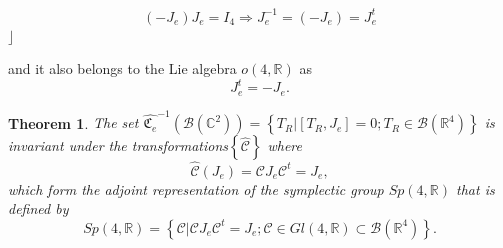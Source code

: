 \documentclass[aps,preprint]{revtex4}%
\newtheorem{theorem}{Theorem}
\begin{document}
\begin{equation}
\left(  -J_{e}\right)  J_{e}=I_{4}\Rightarrow J_{e}^{-1}=\left(
-J_{e}\right)  =J_{e}^{t}%
\end{equation}
$\rfloor$

and it also belongs to the Lie algebra $o\left(  4,\mathbb{R}\right)  $ as
\begin{equation}
J_{e}^{t}=-J_{e}.
\end{equation}


\begin{theorem}
The set $\widehat{\mathfrak{C}_{e}}^{-1}\left(  \mathcal{B}\left(
\mathbb{C}^{2}\right)  \right)  =\left\{  \left.  T_{R}\right\vert \left[
T_{R},J_{e}\right]  =0;T_{R}\in\mathcal{B}\left(  \mathbb{R}^{4}\right)
\right\}  $ is invariant under the transformations$\left\{
\widehat{\mathcal{C}}\right\}  $ where
\begin{equation}
\widehat{\mathcal{C}}\left(  J_{e}\right)  =\mathcal{C}J_{e}\mathcal{C}%
^{t}=J_{e},
\end{equation}
which form the adjoint representation of the symplectic group $Sp\left(
4,\mathbb{R}\right)  $ that is defined by
\begin{equation}
Sp\left(  4,\mathbb{R}\right)  =\left\{  \left.  \mathcal{C}\right\vert
\mathcal{C}J_{e}\mathcal{C}^{t}=J_{e};\mathcal{C}\in Gl\left(  4,\mathbb{R}%
\right)  \subset\mathcal{B}\left(  \mathbb{R}^{4}\right)  \right\}  .
\end{equation}

\end{theorem}
\end{document}
